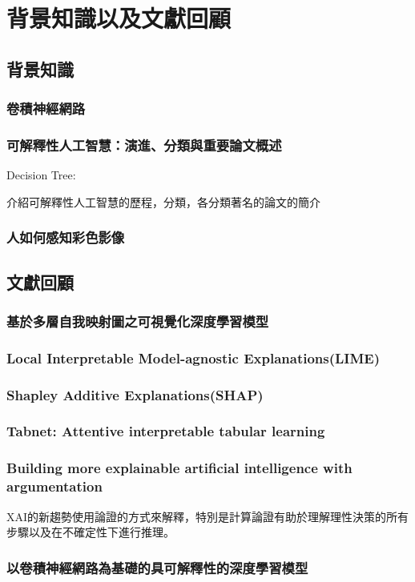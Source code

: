 \documentclass[class=NCU_thesis, crop=false]{standalone}
\begin{document}
\chapter{背景知識以及文獻回顧}
\section{背景知識}
\subsection{卷積神經網路}


\subsection{可解釋性人工智慧：演進、分類與重要論文概述}
Decision Tree:
\cite{rokach2016decision}
\cite{grinsztajn2022treebased}

介紹可解釋性人工智慧的歷程，分類，各分類著名的論文的簡介

\subsection{人如何感知彩色影像}


\section{文獻回顧}
\subsection{基於多層自我映射圖之可視覺化深度學習模型}

\subsection{Local Interpretable Model-agnostic Explanations(LIME)} 
\subsection{Shapley Additive Explanations(SHAP)}

\subsection{Tabnet: Attentive interpretable tabular learning}
\subsection{Building more explainable artificial intelligence with argumentation}
XAI的新趨勢使用論證的方式來解釋，特別是計算論證有助於理解理性決策的所有步驟以及在不確定性下進行推理。 \cite{LONGO2024102301}

\subsection{以卷積神經網路為基礎的具可解釋性的深度學習模型}
\end{document}
